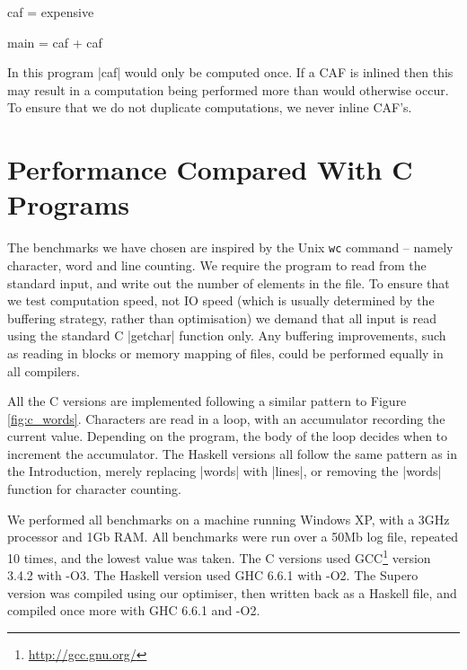 \documentclass{llncs}
\begin{document}
\begin{code}
caf = expensive

main = caf + caf
\end{code}

In this program |caf| would only be computed once. If a CAF is inlined then this may result in a computation being performed more than would otherwise occur. To ensure that we do not duplicate computations, we never inline CAF's.

\section{Performance Compared With C Programs}
\label{sec:c_results}

\begin{comment}
The most comprehensive inter-language benchmarking effort is the Programming Language Shootout\footnote{\url{http://shootout.alioth.debian.org/}}. In the shootout a variety of tasks are implemented in many languages and benchmarked against each other. Unfortunately, in order to ensure a balanced comparison, many restrictions are placed upon the solutions -- some of which severely hamper lazy languages. Inspired by their attempt, we have defined some simpler benchmarks on which it is possible to directly compare Haskell to C.
\end{comment}

The benchmarks we have chosen are inspired by the Unix \texttt{wc} command -- namely character, word and line counting. We require the program to read from the standard input, and write out the number of elements in the file. To ensure that we test computation speed, not IO speed (which is usually determined by the buffering strategy, rather than optimisation) we demand that all input is read using the standard C |getchar| function only. Any buffering improvements, such as reading in blocks or memory mapping of files, could be performed equally in all compilers.

All the C versions are implemented following a similar pattern to Figure \ref{fig:c_words}. Characters are read in a loop, with an accumulator recording the current value. Depending on the program, the body of the loop decides when to increment the accumulator. The Haskell versions all follow the same pattern as in the Introduction, merely replacing |words| with |lines|, or removing the |words| function for character counting.

We performed all benchmarks on a machine running Windows XP, with a 3GHz processor and 1Gb RAM. All benchmarks were run over a 50Mb log file, repeated 10 times, and the lowest value was taken. The C versions used GCC\footnote{\url{http://gcc.gnu.org/}} version 3.4.2 with -O3. The Haskell version used GHC \cite{ghc} 6.6.1 with -O2. The Supero version was compiled using our optimiser, then written back as a Haskell file, and compiled once more with GHC 6.6.1 and -O2.
\end{document}
